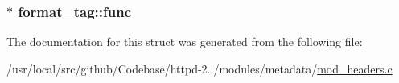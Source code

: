 \subsubsection[{\texorpdfstring{func}{func}}]{$\ast$ format\+\_\+tag\+::func}\hypertarget{structformat__tag_ad55f8a757f66c18cfce26a95b3b4f761}{}\label{structformat__tag_ad55f8a757f66c18cfce26a95b3b4f761}


The documentation for this struct was generated from the following file\+:\begin{DoxyCompactItemize}
\item 
/usr/local/src/github/\+Codebase/httpd-\/2../modules/metadata/\hyperlink{mod__headers_8c}{mod\+\_\+headers.\+c}\end{DoxyCompactItemize}
